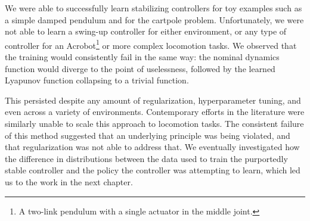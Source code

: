 We were able to successfully learn stabilizing controllers for toy examples such as a simple damped pendulum and for the cartpole problem. Unfortunately, we were not able to learn a swing-up controller for either environment, or any type of controller for an Acrobot\footnote{A two-link pendulum with a single actuator in the middle joint. } or more complex locomotion tasks. We observed that the training would consistently fail in the same way: the nominal dynamics function would diverge to the point of uselessness, followed by the learned Lyapunov function collapsing to a trivial function.

This persisted despite any amount of regularization, hyperparameter tuning, and even across a variety of environments. Contemporary efforts in the literature were similarly unable to scale this approach to locomotion tasks. The consistent failure of this method suggested that an underlying principle was being violated, and that regularization was not able to address that. We eventually investigated how the difference in distributions between the data used to train the purportedly stable controller and the policy the controller was attempting to learn, which led us to the work in the next chapter.
